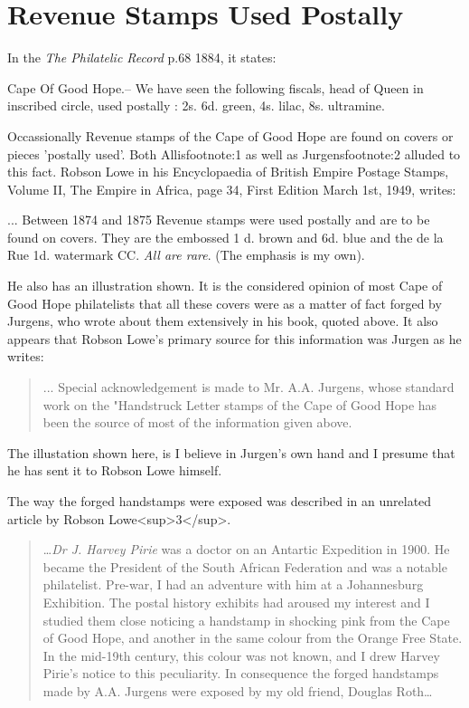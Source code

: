 \chapter{Revenue Stamps Used Postally}

In the \textit{The Philatelic Record} p.68 1884, it states:

Cape Of Good Hope.-- We have seen the following fiscals, head of Queen in inscribed circle, used postally : 2s. 6d. green, 4s. lilac, 8s. ultramine.





	 
Occassionally Revenue stamps of the Cape of Good Hope are 
found on covers or pieces 'postally used'. Both Allis{{footnote:1}} 
as well as Jurgens{{footnote:2}} alluded to this fact. Robson Lowe 
in his Encyclopaedia of British Empire Postage Stamps, Volume II, 
The Empire in Africa, page 34, First Edition March 1st, 1949, writes:

\begin{blockquote}
... Between 1874 and 1875 Revenue stamps were used postally 
and are to be found on covers. They are the embossed 1 d. 
brown and 6d. blue and the de la Rue 1d. watermark CC. 
\textit{All are rare}. (The emphasis is my own).
\end{blockquote}

 
He also has an illustration shown. It is the considered 
opinion of most Cape of Good Hope philatelists that all 
these covers were as a matter of fact forged by Jurgens, 
who wrote about them extensively in his book, quoted above. 
It also appears that Robson Lowe's primary source for this 
information was Jurgen as he writes:

\begin{quotation}
... Special acknowledgement is made to Mr. A.A. Jurgens, 
whose standard work on the "Handstruck Letter stamps of 
the Cape of Good Hope has been the source of most of the 
information given above.
\end{quotation}  
 
The illustation shown here, is I believe in Jurgen's own 
hand and I presume that he 
has sent it to Robson Lowe himself. 

The way the forged handstamps were exposed was described in an unrelated
article by Robson Lowe<sup>3</sup>.

\begin{quotation}
\ldots \textit{Dr J. Harvey Pirie} was a doctor on an Antartic
Expedition in 1900. He became the President of the South African
Federation and was a notable philatelist. Pre-war, I had an adventure
with him at a Johannesburg Exhibition. The postal history exhibits had
aroused my interest and I studied them close noticing a handstamp
in shocking pink from the Cape of Good Hope, and another in the same
colour from the Orange Free State. In the mid-19th century, this colour was
not known, and I drew Harvey Pirie's notice to this peculiarity. In consequence
the forged handstamps made by A.A. Jurgens were exposed by my old
friend, Douglas Roth\ldots
\end{quotation}

